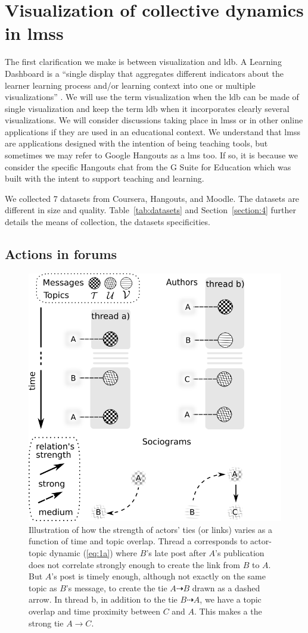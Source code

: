 \documentclass[a4paper,twoside]{article}
\begin{document}
\section{Visualization of collective dynamics in \glspl{lms}}
\label{section:2}

The first clarification we make is between visualization and  \gls{ldb}.  A Learning Dashboard is a ``single display that aggregates different indicators about the learner learning process and/or learning context into one or multiple visualizations'' \citep{Schwendimann2017}.  We will use the term visualization when the \gls{ldb} can be made of single visualization and keep the term \gls{ldb} when it incorporates clearly several visualizations.  
We will consider discussions taking place in \glspl{lms} or in other online applications if they are used in an educational context.  We understand that \glspl{lms} are applications designed with the intention of being teaching tools, but sometimes we may refer to Google Hangouts as a \gls{lms} too.   If so, it is because we consider the specific Hangouts chat from the G Suite for Education which was built with the intent to support teaching and learning.

We collected 7 datasets from Coursera, Hangouts, and Moodle.  The datasets are different in size and quality. Table~\ref{tab:datasets} and Section~\ref{section:4} further details the means of collection, the datasets specificities.

\subsection{Actions in forums}

\begin{figure}[b]
 \small{
  \caption{\label{fig:discussion}
   Illustration of how the strength of actors' ties (or links) varies as a function of time and topic overlap.  Thread a corresponds to actor-topic dynamic (\ref{eq:1a}) where $B$'s late post after $A$'s  publication does not correlate strongly enough to create the link from $B$ to $A$.  But $A$'s  post is timely enough, although not exactly on the same topic as $B$'s message, to create the tie $A \dashrightarrow B$ drawn as a dashed arrow.  In thread b, in addition to the tie $B \dashrightarrow A$, we have a topic overlap and time proximity between $C$ and $A$.  This makes a the strong tie $A \to C$.
  }}
 \centering
 \includegraphics[width=.45\textwidth]{images/discussion.png}
\end{figure}
\end{document}
